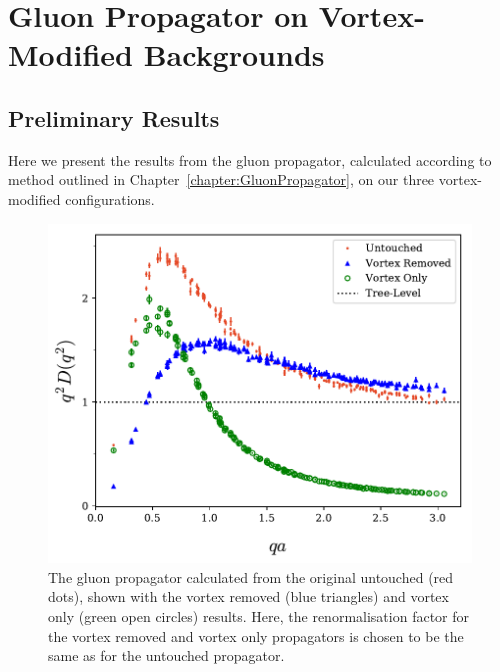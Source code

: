 
\chapter{Gluon Propagator on Vortex-Modified Backgrounds}\label{chapter:GluonPropagatorResults}
\ifpdf
    \graphicspath{{Chapter6/Figs/Raster/}{Chapter6/Figs/PDF/}{Chapter6/Figs/}}
\else
    \graphicspath{{Chapter6/Figs/Vector/}{Chapter6/Figs/}}
\fi
\section{Preliminary Results}
Here we present the results from the gluon propagator, calculated according to method outlined in Chapter~\ref{chapter:GluonPropagator}, on our three vortex-modified configurations.
%
\begin{figure}[tb]
\centering
\includegraphics[width=\linewidth]{./ScalarGluComp_q2_NoCoolSum.pdf}
\caption{\label{fig:NoCool}The gluon propagator calculated from the original untouched (red dots), shown with the vortex removed (blue triangles) and vortex only (green open circles) results. Here, the renormalisation factor for the vortex removed and vortex only propagators is chosen to be the same as for the untouched propagator.}
\end{figure}
